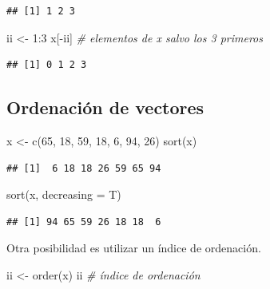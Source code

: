 \documentclass[
]{book}
\newenvironment{Shaded}{\begin{snugshade}}{\end{snugshade}}
\newcommand{\AttributeTok}[1]{\textcolor[rgb]{0.77,0.63,0.00}{#1}}
\newcommand{\CommentTok}[1]{\textcolor[rgb]{0.56,0.35,0.01}{\textit{#1}}}
\newcommand{\DecValTok}[1]{\textcolor[rgb]{0.00,0.00,0.81}{#1}}
\newcommand{\FunctionTok}[1]{\textcolor[rgb]{0.00,0.00,0.00}{#1}}
\newcommand{\NormalTok}[1]{#1}
\newcommand{\OtherTok}[1]{\textcolor[rgb]{0.56,0.35,0.01}{#1}}
\newcommand{\SpecialCharTok}[1]{\textcolor[rgb]{0.00,0.00,0.00}{#1}}
\theoremstyle{break}
\theoremstyle{nonumberplain}
\begin{document}
\begin{verbatim}
## [1] 1 2 3
\end{verbatim}

\begin{Shaded}
\begin{Highlighting}[]
\NormalTok{ii }\OtherTok{\textless{}{-}} \DecValTok{1}\SpecialCharTok{:}\DecValTok{3}
\NormalTok{x[}\SpecialCharTok{{-}}\NormalTok{ii]  }\CommentTok{\# elementos de x salvo los 3 primeros}
\end{Highlighting}
\end{Shaded}

\begin{verbatim}
## [1] 0 1 2 3
\end{verbatim}

\hypertarget{ordenaciuxf3n-de-vectores}{%
\subsection{Ordenación de vectores}\label{ordenaciuxf3n-de-vectores}}

\begin{Shaded}
\begin{Highlighting}[]
\NormalTok{x }\OtherTok{\textless{}{-}} \FunctionTok{c}\NormalTok{(}\DecValTok{65}\NormalTok{, }\DecValTok{18}\NormalTok{, }\DecValTok{59}\NormalTok{, }\DecValTok{18}\NormalTok{, }\DecValTok{6}\NormalTok{, }\DecValTok{94}\NormalTok{, }\DecValTok{26}\NormalTok{)}
\FunctionTok{sort}\NormalTok{(x)}
\end{Highlighting}
\end{Shaded}

\begin{verbatim}
## [1]  6 18 18 26 59 65 94
\end{verbatim}

\begin{Shaded}
\begin{Highlighting}[]
\FunctionTok{sort}\NormalTok{(x, }\AttributeTok{decreasing =}\NormalTok{ T)}
\end{Highlighting}
\end{Shaded}

\begin{verbatim}
## [1] 94 65 59 26 18 18  6
\end{verbatim}

Otra posibilidad es utilizar un índice de ordenación.

\begin{Shaded}
\begin{Highlighting}[]
\NormalTok{ii }\OtherTok{\textless{}{-}} \FunctionTok{order}\NormalTok{(x)}
\NormalTok{ii  }\CommentTok{\# índice de ordenación}
\end{Highlighting}
\end{Shaded}
\end{document}

